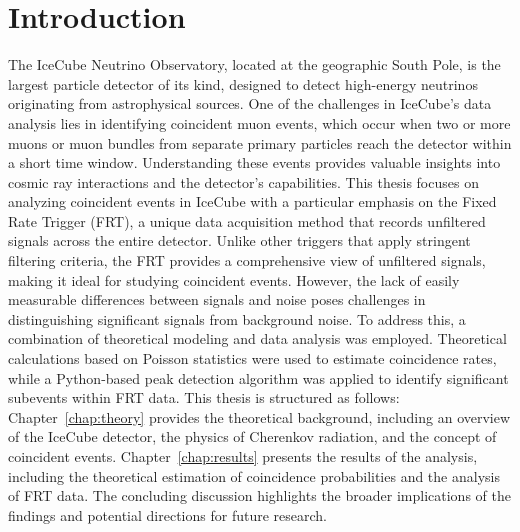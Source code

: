 \chapter{Introduction}

The IceCube Neutrino Observatory, located at the geographic South Pole, is the largest particle detector of its kind, designed to detect high-energy neutrinos originating 
from astrophysical sources. One of the challenges in IceCube's data analysis lies in identifying coincident muon events, which occur when two or more muons or muon bundles
from separate 
primary particles reach the detector within a short time window. Understanding these events provides valuable insights into cosmic ray interactions and the 
detector's capabilities.
This thesis focuses on analyzing coincident events in IceCube with a particular emphasis on the Fixed Rate Trigger (FRT), a unique data acquisition method that 
records unfiltered signals across the entire detector. Unlike other triggers that apply stringent filtering criteria, the FRT provides a comprehensive view of 
unfiltered signals, making it ideal for studying coincident events. However, the lack of easily measurable differences between signals and noise poses challenges 
in distinguishing significant signals from background noise.
To address this, a combination of theoretical modeling and data analysis was employed. Theoretical calculations based on Poisson statistics were used to estimate 
coincidence rates, while a Python-based peak detection algorithm was applied to identify significant subevents within FRT data. 
This thesis is structured as follows: Chapter~\ref{chap:theory} provides the theoretical background, including an overview of the IceCube detector, the physics of Cherenkov 
radiation, and the concept of coincident events. Chapter~\ref{chap:results} presents the results of the analysis, including the theoretical estimation of coincidence probabilities 
and the analysis of FRT data. The concluding discussion highlights the broader implications of the findings and potential directions for future research.
